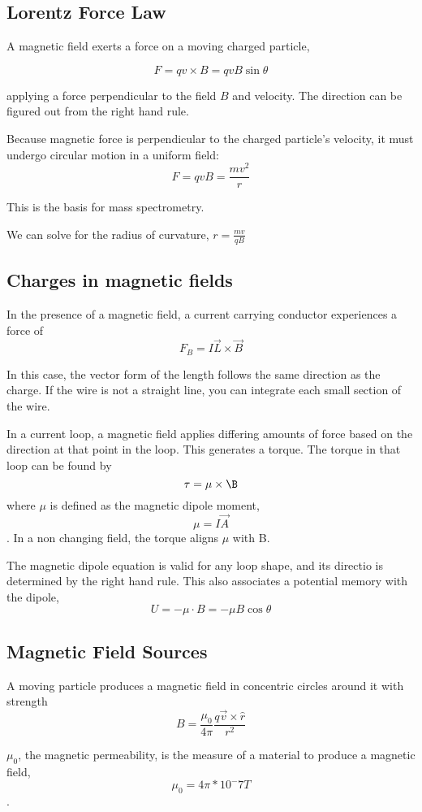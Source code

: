 \documentclass{article}
\begin{document}
\subsection{Lorentz Force Law}

A magnetic field exerts a force on a moving charged particle,

$$F=q v \times B=qvB\sin{\theta}$$

applying a force perpendicular to the field $B$ and velocity. The direction can be figured out from the right hand rule.

Because magnetic force is perpendicular to the charged particle's velocity, it must undergo circular motion in a uniform field:
$$F=qvB=\frac{mv^2}{r}$$

This is the basis for mass spectrometry.

We can solve for the radius of curvature, $r=\frac{mv}{qB}$

\subsection{Charges in magnetic fields}

In the presence of a magnetic field, a current carrying conductor experiences a force of $$F_B=I \vec{L}\times\vec{B}$$

In this case, the vector form of the length follows the same direction as the charge.
If the wire is not a straight line, you can integrate each small section of the wire.

In a current loop, a magnetic field applies differing amounts of force based on the direction at that point in the loop. This generates a torque. The torque in that loop
can be found by $$\tau=\mu\times\B$$ where $\mu$ is defined as the magnetic dipole moment, $$\mu=I\vec{A}$$. In a non changing field, the torque aligns $\mu$ with B.

The magnetic dipole equation is valid for any loop shape, and its directio is determined by the right hand rule. This also associates a potential memory with the dipole, 
$$U=-\mu\cdot B=-\mu B \cos{\theta}$$

\subsection{Magnetic Field Sources}
A moving particle produces a magnetic field in concentric circles around it 
with strength $$B=\frac{\mu_0}{4\pi} \frac{q\vec{v}\times \hat{r}}{r^2}$$

$\mu_0$, the magnetic permeability, is the measure of a material to produce a
magnetic field, $$\mu_0=4\pi * 10^-7 T$$.
\end{document}
